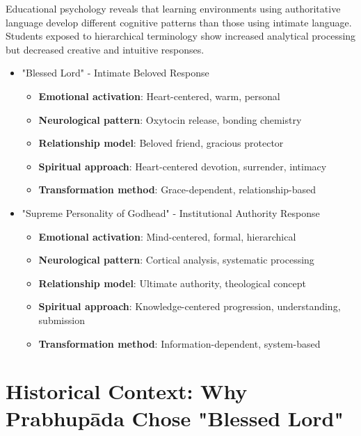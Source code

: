 \documentclass[11pt,twoside]{book}
\begin{document}
Educational psychology reveals that learning environments using authoritative language develop different cognitive patterns than those using intimate language. Students exposed to hierarchical terminology show increased analytical processing but decreased creative and intuitive responses.
\begin{itemize}
\item "Blessed Lord" - Intimate Beloved Response
\label{sec:org9df42d3}
\begin{itemize}
\item \textbf{\textbf{Emotional activation}}: Heart-centered, warm, personal
\item \textbf{\textbf{Neurological pattern}}: Oxytocin release, bonding chemistry
\item \textbf{\textbf{Relationship model}}: Beloved friend, gracious protector
\item \textbf{\textbf{Spiritual approach}}: Heart-centered devotion, surrender, intimacy
\item \textbf{\textbf{Transformation method}}: Grace-dependent, relationship-based
\end{itemize}
\item "Supreme Personality of Godhead" - Institutional Authority Response
\label{sec:org5d6b914}
\begin{itemize}
\item \textbf{\textbf{Emotional activation}}: Mind-centered, formal, hierarchical
\item \textbf{\textbf{Neurological pattern}}: Cortical analysis, systematic processing
\item \textbf{\textbf{Relationship model}}: Ultimate authority, theological concept
\item \textbf{\textbf{Spiritual approach}}: Knowledge-centered progression, understanding, submission
\item \textbf{\textbf{Transformation method}}: Information-dependent, system-based
\end{itemize}
\end{itemize}
\section*{Historical Context: Why Prabhupāda Chose "Blessed Lord"}
\label{sec:orgb1ac65a}
\end{document}
